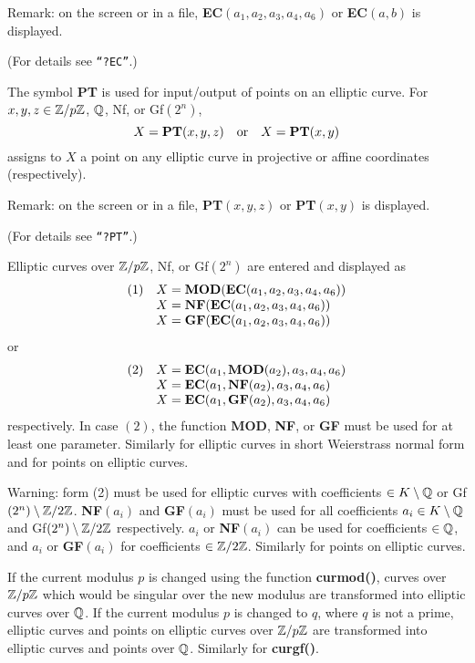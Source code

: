 Remark: on the screen or in a file, {\bf EC}$(a_1, a_2, a_3, a_4, a_6)$ or {\bf EC}$(a, b)$
is displayed.

(For details see {\tt ``?EC''}.)

The symbol {\bf PT} is used for input/output of points on an elliptic curve.
For $x,y,z \in \mbox{$\mathbb Z$}/p\mbox{$\mathbb Z$}$, $\mbox{$\mathbb Q$}$, Nf, or Gf$(2^n)$,
$$
X = \mbox{\bf PT}(x, y, z) \quad \mbox{or}\quad X = \mbox{\bf PT}(x,y)
$$
assigns to $X$ a point on any elliptic curve in projective or affine coordinates
(respectively).

Remark: on the screen or in a file, {\bf PT}$(x,y,z)$ or {\bf PT}$(x,y)$ is displayed.

(For details see {\tt ``?PT''}.)

Elliptic curves over $\mbox{$\mathbb Z$} /p\mbox{$\mathbb Z$} $, Nf, or Gf$(2^n)$ are entered and displayed as
$$\begin{array}{rl}
(1) & X  =  \mbox{\bf MOD}(\mbox{\bf EC}(a_1,a_2,a_3,a_4,a_6))\\
 & X  = \mbox{\bf NF}(\mbox{\bf EC}(a_1,a_2,a_3,a_4,a_6))\\
 & X  = \mbox{\bf GF}(\mbox{\bf EC}(a_1,a_2,a_3,a_4,a_6))
\end{array}
$$
or
$$\begin{array}{rl}
(2) & X  =  \mbox{\bf EC}(a_1,\mbox{\bf MOD}(a_2),a_3,a_4,a_6)\\
 & X  = \mbox{\bf EC}(a_1,\mbox{\bf NF}(a_2),a_3,a_4,a_6)\\
 & X  = \mbox{\bf EC}(a_1,\mbox{\bf GF}(a_2),a_3,a_4,a_6)
\end{array}$$
respectively. In case $(2)$, the function {\bf MOD}, {\bf NF}, or {\bf GF} must be used
for at least one parameter. Similarly for elliptic curves in short Weierstrass normal form
and for points on elliptic curves.

Warning: form (2) must be used for elliptic curves with coefficients 
$\in K\setminus \mbox{$\mathbb Q$}$ or Gf$(2^n)\setminus \mbox{$\mathbb Z$}/2\mbox{$\mathbb Z$}$. {\bf NF}$(a_i)$ and 
{\bf GF}$(a_i)$ must be used for all coefficients $a_i \in K\setminus \mbox{$\mathbb Q$}$ and 
Gf$(2^n)\setminus \mbox{$\mathbb Z$}/2\mbox{$\mathbb Z$}$ respectively. $a_i$ or {\bf NF}$(a_i)$ can be used 
for coefficients $\in \mbox{$\mathbb Q$}$, and $a_i$ or {\bf GF}$(a_i)$ for coefficients 
$\in \mbox{$\mathbb Z$}/2\mbox{$\mathbb Z$}$. Similarly for points on elliptic curves.

If the current modulus $p$ is changed using the function {\bf curmod()}, 
curves over $\mbox{$\mathbb Z$} /p\mbox{$\mathbb Z$}$ which would be singular over the new modulus are 
transformed into elliptic curves over $\mbox{$\mathbb Q$}$. If the current modulus $p$ is 
changed to $q$, where $q$ is not a prime, elliptic curves and points on 
elliptic curves over $\mbox{$\mathbb Z$} /p\mbox{$\mathbb Z$}$ are transformed into elliptic curves and points 
over $\mbox{$\mathbb Q$}$. Similarly for {\bf curgf()}.

